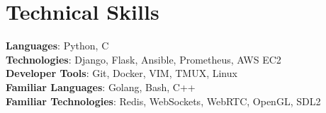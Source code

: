 \documentclass[letterpaper,11pt]{article}
\begin{document}
%
\section{Technical Skills}
 \begin{itemize}[leftmargin=0.15in, label={}]
    \small{\item{
     \textbf{Languages}{: Python, C} \\
     \textbf{Technologies}{: Django, Flask, Ansible, Prometheus, AWS EC2} \\
     \textbf{Developer Tools}{: Git, Docker, VIM, TMUX, Linux} \\
     \textbf{Familiar Languages}{: Golang, Bash, C++} \\
     \textbf{Familiar Technologies}{: Redis, WebSockets, WebRTC, OpenGL, SDL2} \\
    }}
 \end{itemize}


\end{document}
